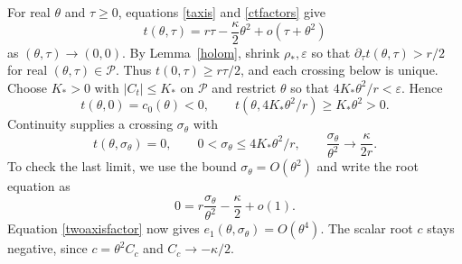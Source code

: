 \documentclass[11pt,letterpaper,reqno]{amsart}
\theoremstyle{remark}
\begin{document}
For real $\theta$ and $\tau\geq0$, equations \eqref{taxis} and
\eqref{ctfactors} give
\begin{equation}\label{crossingbalance}
 t(\theta,\tau)=r\tau-\frac\kappa2\theta^2
                   +o(\tau+\theta^2)
\end{equation}
as $(\theta,\tau)\to(0,0)$.
By Lemma~\ref{holom}, shrink $\rho_*,\varepsilon$ so that
$\partial_\tau t(\theta,\tau)>r/2$ for real $(\theta,\tau)\in\mathcal P$.
Thus $t(0,\tau)\geq r\tau/2$, and each crossing below is unique.
Choose $K_*>0$ with $|C_t|\leq K_*$ on $\mathcal P$
and restrict $\theta$ so that $4K_*\theta^2/r<\varepsilon$. Hence
\[
 t(\theta,0)=c_0(\theta)<0,
 \qquad t(\theta,4K_*\theta^2/r)\geq K_*\theta^2>0.
\]
Continuity supplies a crossing $\sigma_\theta$ with
\begin{equation}\label{cross}
 t(\theta,\sigma_\theta)=0,\qquad
 0<\sigma_\theta\leq4K_*\theta^2/r,
 \qquad \frac{\sigma_\theta}{\theta^2}\longrightarrow\frac\kappa{2r}.
\end{equation}
To check the last limit, we use the bound $\sigma_\theta=O(\theta^2)$
and write the root equation as
\[
 0=r\frac{\sigma_\theta}{\theta^2}
       -\frac\kappa2+o(1).
\]
Equation \eqref{twoaxisfactor} now gives
$e_1(\theta,\sigma_\theta)=O(\theta^4)$.
The scalar root $c$ stays negative, since $c=\theta^2C_c$ and
$C_c\to-\kappa/2$.
\end{document}
